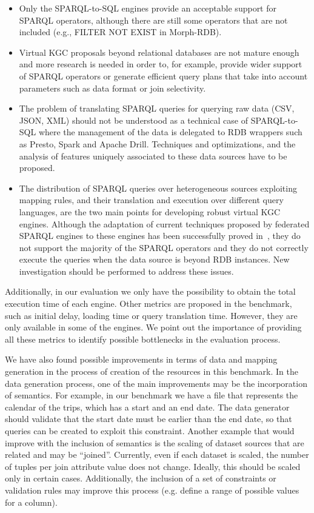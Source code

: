\begin{itemize}
    \item Only the SPARQL-to-SQL engines provide an acceptable support for SPARQL operators, although there are still some operators that are not included (e.g., FILTER NOT EXIST in Morph-RDB).
    \item Virtual KGC proposals beyond relational databases are not mature enough and more research is needed in order to, for example, provide wider support of SPARQL operators or generate efficient query plans that take into account parameters such as data format or join selectivity.
    \item The problem of translating SPARQL queries for querying raw data (CSV, JSON, XML) should not be understood as a technical case of SPARQL-to-SQL where the management of the data is delegated to RDB wrappers such as Presto, Spark and Apache Drill. Techniques and optimizations, and the analysis of features uniquely associated to these data sources have to be proposed.
    \item The distribution of SPARQL queries over heterogeneous sources exploiting mapping rules, and their translation and execution over different query languages, are the two main points for developing robust virtual KGC engines. Although the adaptation of current techniques proposed by federated SPARQL engines to these engines has been successfully proved in~\citep{endris2019ontario,mami2019querying}, they do not support the majority of the SPARQL operators and they do not correctly execute the queries when the data source is beyond RDB instances. New investigation should be performed to address these issues.
\end{itemize}


Additionally, in our evaluation we only have the possibility to obtain the total execution time of each engine. Other metrics are proposed in the benchmark, such as initial delay, loading time or query translation time. However, they are only available in some of the engines. We point out the importance of providing all these metrics to identify possible bottlenecks in the evaluation process.

We have also found possible improvements in terms of data and mapping generation in the process of creation of the resources in this benchmark. In the data generation process, one of the main improvements may be the incorporation of semantics. For example, in our benchmark we have a file that represents the calendar of the trips, which has a start and an end date. The data generator should validate that the start date must be earlier than the end date, so that queries can be created to exploit this constraint. Another example that would improve with the inclusion of semantics is the scaling of dataset sources that are related and may be ``joined''. Currently, even if each dataset is scaled, the number of tuples per join attribute value does not change. Ideally, this should be scaled only in certain cases. Additionally, the inclusion of a set of constraints or validation rules may improve this process (e.g. define a range of possible values for a column).

